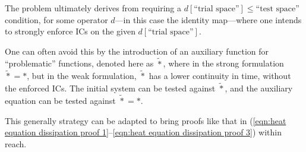     The problem ultimately derives from requiring a $d[\text{``trial space''}]  \leqslant  \text{``test space''}$ condition, for some operator $d$—in this case the identity map—where one intends to strongly enforce ICs on the given $d[\text{``trial space''}]$.

    One can often avoid this by the introduction of an auxiliary function for ``problematic'' functions, denoted here as $\widetilde{*}$, where in the strong formulation $\widetilde{*}  =  *$, but in the weak formulation, $\widetilde{*}$ has a lower continuity in time, without the enforced ICs. The initial system can be tested against $\widetilde{*}$, and the auxiliary equation can be tested against $\widetilde{*}  =  *$.

    This generally strategy can be adapted to bring proofs like that in (\ref{eqn:heat equation dissipation proof 1}–\ref{eqn:heat equation dissipation proof 3}) within reach.



    